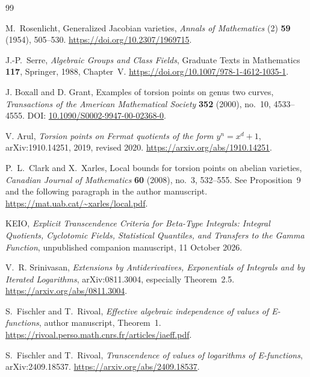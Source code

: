 \documentclass[11pt,a4paper]{article}
\theoremstyle{definition}
\theoremstyle{remark}
\numberwithin{equation}{section}
\begin{document}
\begin{thebibliography}{99}

M.~Rosenlicht,
Generalized Jacobian varieties,
\emph{Annals of Mathematics} (2) \textbf{59} (1954), 505--530.
\url{https://doi.org/10.2307/1969715}.

J.-P.~Serre,
\emph{Algebraic Groups and Class Fields},
Graduate Texts in Mathematics \textbf{117}, Springer, 1988,
Chapter~V.
\url{https://doi.org/10.1007/978-1-4612-1035-1}.

J. Boxall and D. Grant,
Examples of torsion points on genus two curves,
\emph{Transactions of the American Mathematical Society}
\textbf{352} (2000), no.~10, 4533--4555.
DOI: \href{https://doi.org/10.1090/S0002-9947-00-02368-0}
{10.1090/S0002-9947-00-02368-0}.

V. Arul,
\emph{Torsion points on Fermat quotients of the form $y^n=x^d+1$},
arXiv:1910.14251, 2019, revised 2020.
\url{https://arxiv.org/abs/1910.14251}.

P.~L.~Clark and X.~Xarles,
Local bounds for torsion points on abelian varieties,
\emph{Canadian Journal of Mathematics} \textbf{60} (2008), no.~3,
532--555.
See Proposition~9 and the following paragraph in the author manuscript.
\url{https://mat.uab.cat/~xarles/local.pdf}.

KEIO, \emph{Explicit Transcendence Criteria for Beta-Type Integrals:
Integral Quotients, Cyclotomic Fields, Statistical Quantiles, and Transfers
to the Gamma Function}, unpublished companion manuscript, 11 October 2026.

V.~R. Srinivasan, \emph{Extensions by Antiderivatives, Exponentials of
Integrals and by Iterated Logarithms}, arXiv:0811.3004, especially
Theorem~2.5. \url{https://arxiv.org/abs/0811.3004}.

S.~Fischler and T.~Rivoal, \emph{Effective algebraic independence of values
of E-functions}, author manuscript, Theorem~1.
\url{https://rivoal.perso.math.cnrs.fr/articles/iaeff.pdf}.

S.~Fischler and T.~Rivoal, \emph{Transcendence of values of logarithms of
E-functions}, arXiv:2409.18537.
\url{https://arxiv.org/abs/2409.18537}.

\end{thebibliography}
\endgroup
\end{document}
